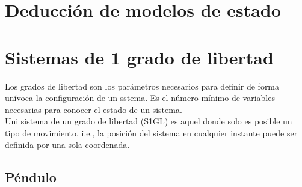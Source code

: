 \documentclass[12pt,spanish,lettersize]{report}
\begin{document}
\section{Deducci\'on de modelos de estado}
\section{Sistemas de 1 grado de libertad}
Los grados de libertad son los par\'ametros necesarios para definir de forma un\'ivoca la configuraci\'on de un sstema. Es el n\'umero m\'inimo de variables necesarias para conocer el estado de un sistema.\\
Uni sistema de un grado de libertad (S1GL) es aquel donde solo es posible un tipo de movimiento, i.e., la posici\'on del sistema en cualquier instante puede ser definida por una sola coordenada.
\subsection{P\'endulo}
\end{document}
